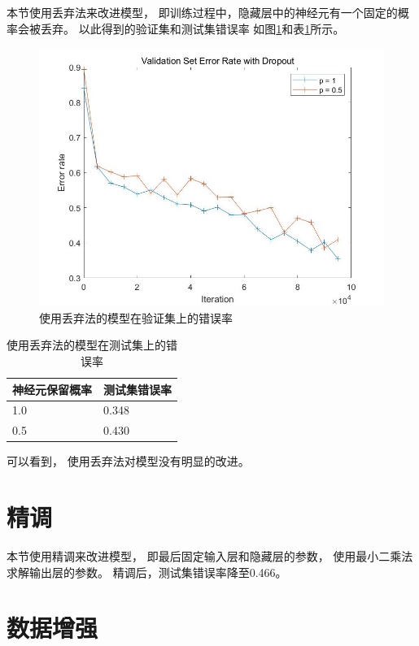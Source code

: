 \documentclass{article}
\begin{document}
本节使用丢弃法来改进模型，
即训练过程中，隐藏层中的神经元有一个固定的概率会被丢弃。
以此得到的验证集和测试集错误率
如图\ref{fig:7}和表\ref{table:7}所示。

\begin{figure}[h]
\includegraphics[width=\textwidth]{7.jpg}
\caption{使用丢弃法的模型在验证集上的错误率}
\label{fig:7}
\end{figure}

\begin{table}[h]
\centering
\begin{tabular}{|l|l|} 
\hline
神经元保留概率 & 测试集错误率 \\
\hline
1.0 & 0.348 \\
0.5 & 0.430 \\
\hline
\end{tabular}
\caption{使用丢弃法的模型在测试集上的错误率}
\label{table:7}
\end{table}

可以看到，
使用丢弃法对模型没有明显的改进。

\section{精调}

本节使用精调来改进模型，
即最后固定输入层和隐藏层的参数，
使用最小二乘法求解输出层的参数。
精调后，测试集错误率降至0.466。

\section{数据增强}
\end{document}
